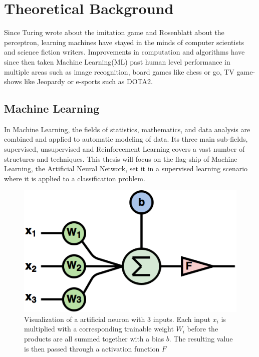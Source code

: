 \chapter{Theoretical Background}
Since Turing wrote about the imitation game\cite{imitationgame} and Rosenblatt about the perceptron\cite{perceptron}, learning machines have stayed in the minds of computer scientists and science fiction writers. 
Improvements in computation and algorithms have since then taken Machine Learning(ML) past human level performance in multiple areas such as image recognition\cite{youtubecats}\cite{deepface}, board games like chess\cite{alphazero} or go\cite{alphago}, TV game-shows like Jeopardy\cite{jeopardy} or e-sports such as DOTA2\cite{dota2}.

\section{Machine Learning}
\label{background:ML}
 
In Machine Learning, the fields of statistics, mathematics, and data analysis are combined and applied to automatic modeling of data. Its three main sub-fields, supervised, unsupervised and Reinforcement Learning covers a vast number of structures and techniques. This thesis will focus on the flag-ship of Machine Learning, the Artificial Neural Network,  set it in a supervised learning scenario where it is applied to a classification problem.

\begin{figure}[ht] 
\centering
\includegraphics[width=0.7\linewidth]{Chapters/2.Background/figures/artificial_neuron.png}
\caption[Visualization of a artificial neuron]{Visualization of a artificial neuron with 3 inputs. Each input \(x_{i}\) is multiplied with a corresponding trainable weight \(W_{i}\) before the products are all summed together with a bias \(b\). The resulting value is then passed through a activation function \(F\)}
\label{fig:artificialneuron}
\end{figure}

